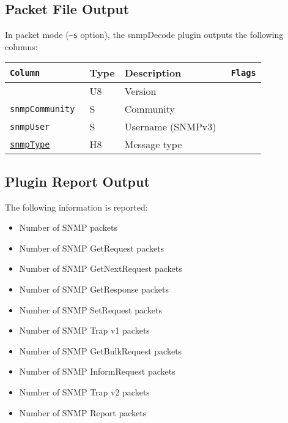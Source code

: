 \documentclass[documentation]{subfiles}
\begin{document}
\subsection{Packet File Output}
In packet mode ({\tt --s} option), the snmpDecode plugin outputs the following columns:
\begin{longtable}{>{\tt}lll>{\tt\small}l}
    \toprule
    {\bf Column} & {\bf Type} & {\bf Description} & {\bf Flags}\\
    \midrule\endhead%
    \nameref{snmpVersion}          & U8 & Version           & \\
    snmpCommunity                  & S  & Community         & \\
    snmpUser                       & S  & Username (SNMPv3) & \\
    \hyperref[snmpTypes]{snmpType} & H8 & Message type      & \\
    \bottomrule
\end{longtable}

\subsection{Plugin Report Output}
The following information is reported:
\begin{itemize}
    \item Number of SNMP packets
    \item Number of SNMP GetRequest packets
    \item Number of SNMP GetNextRequest packets
    \item Number of SNMP GetResponse packets
    \item Number of SNMP SetRequest packets
    \item Number of SNMP Trap v1 packets
    \item Number of SNMP GetBulkRequest packets
    \item Number of SNMP InformRequest packets
    \item Number of SNMP Trap v2 packets
    \item Number of SNMP Report packets
\end{itemize}
\end{document}

